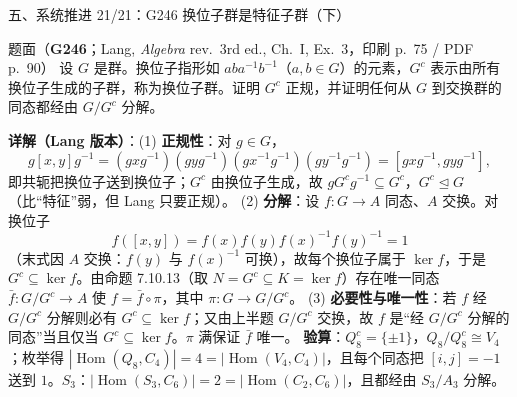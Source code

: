 \documentclass[aspectratio=169,10pt,fontset=none]{ctexbeamer}
\newcommand{\ex}[1]{\textcolor{accent}{\footnotesize\bfseries #1}}
\newcommand{\key}[1]{\textcolor{ink}{\bfseries #1}}
\begin{document}
\begin{frame}[t]{五、系统推进 21/21：G246 换位子群是特征子群（下）}
\scriptsize
\begin{block}{\footnotesize 题面（\ex{G246}；Lang, \emph{Algebra} rev.~3rd ed., Ch.~I, Ex.~3，印刷 p.~75 / PDF p.~90）}
设 $G$ 是群。换位子指形如 $aba^{-1}b^{-1}$（$a,b\in G$）的元素，$G^c$ 表示由所有换位子生成的子群，称为换位子群。证明 $G^c$ 正规，并证明任何从 $G$ 到交换群的同态都经由 $G/G^c$ 分解。
\end{block}
\key{详解（Lang 版本）}：(1) \textbf{正规性}：对 $g\in G$，
\[ g[x,y]g^{-1}=(gxg^{-1})(gyg^{-1})(gx^{-1}g^{-1})(gy^{-1}g^{-1})=[gxg^{-1},gyg^{-1}], \]
即共轭把换位子送到换位子；$G^c$ 由换位子生成，故 $gG^cg^{-1}\subseteq G^c$，$G^c\trianglelefteq G$（比“特征”弱，但 Lang 只要正规）。
(2) \textbf{分解}：设 $f:G\to A$ 同态、$A$ 交换。对换位子
\[ f([x,y])=f(x)f(y)f(x)^{-1}f(y)^{-1}=1 \]
（末式因 $A$ 交换：$f(y)$ 与 $f(x)^{-1}$ 可换），故每个换位子属于 $\ker f$，于是 $G^c\subseteq\ker f$。由命题 7.10.13（取 $N=G^c\subseteq K=\ker f$）存在唯一同态 $\bar f:G/G^c\to A$ 使 $f=\bar f\circ\pi$，其中 $\pi:G\to G/G^c$。
(3) \textbf{必要性与唯一性}：若 $f$ 经 $G/G^c$ 分解则必有 $G^c\subseteq\ker f$；又由上半题 $G/G^c$ 交换，故 $f$ 是“经 $G/G^c$ 分解的同态”当且仅当 $G^c\subseteq\ker f$。$\pi$ 满保证 $\bar f$ 唯一。
\key{验算}：$Q_8^c=\{\pm1\}$，$Q_8/Q_8^c\cong V_4$；枚举得 $|\operatorname{Hom}(Q_8,C_4)|=4=|\operatorname{Hom}(V_4,C_4)|$，且每个同态把 $[i,j]=-1$ 送到 $1$。$S_3$：$|\operatorname{Hom}(S_3,C_6)|=2=|\operatorname{Hom}(C_2,C_6)|$，且都经由 $S_3/A_3$ 分解。
\end{frame}
\end{document}
